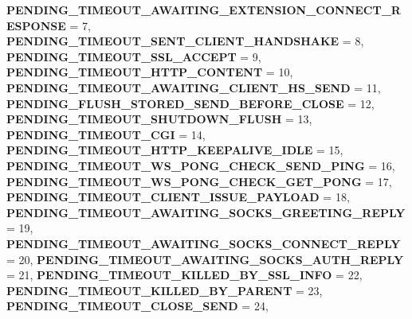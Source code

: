 \begin{DoxyCompactItemize}
{\bfseries P\+E\+N\+D\+I\+N\+G\+\_\+\+T\+I\+M\+E\+O\+U\+T\+\_\+\+A\+W\+A\+I\+T\+I\+N\+G\+\_\+\+E\+X\+T\+E\+N\+S\+I\+O\+N\+\_\+\+C\+O\+N\+N\+E\+C\+T\+\_\+\+R\+E\+S\+P\+O\+N\+SE} = 7, 
{\bfseries P\+E\+N\+D\+I\+N\+G\+\_\+\+T\+I\+M\+E\+O\+U\+T\+\_\+\+S\+E\+N\+T\+\_\+\+C\+L\+I\+E\+N\+T\+\_\+\+H\+A\+N\+D\+S\+H\+A\+KE} = 8, 
{\bfseries P\+E\+N\+D\+I\+N\+G\+\_\+\+T\+I\+M\+E\+O\+U\+T\+\_\+\+S\+S\+L\+\_\+\+A\+C\+C\+E\+PT} = 9, 
\newline
{\bfseries P\+E\+N\+D\+I\+N\+G\+\_\+\+T\+I\+M\+E\+O\+U\+T\+\_\+\+H\+T\+T\+P\+\_\+\+C\+O\+N\+T\+E\+NT} = 10, 
{\bfseries P\+E\+N\+D\+I\+N\+G\+\_\+\+T\+I\+M\+E\+O\+U\+T\+\_\+\+A\+W\+A\+I\+T\+I\+N\+G\+\_\+\+C\+L\+I\+E\+N\+T\+\_\+\+H\+S\+\_\+\+S\+E\+ND} = 11, 
{\bfseries P\+E\+N\+D\+I\+N\+G\+\_\+\+F\+L\+U\+S\+H\+\_\+\+S\+T\+O\+R\+E\+D\+\_\+\+S\+E\+N\+D\+\_\+\+B\+E\+F\+O\+R\+E\+\_\+\+C\+L\+O\+SE} = 12, 
{\bfseries P\+E\+N\+D\+I\+N\+G\+\_\+\+T\+I\+M\+E\+O\+U\+T\+\_\+\+S\+H\+U\+T\+D\+O\+W\+N\+\_\+\+F\+L\+U\+SH} = 13, 
\newline
{\bfseries P\+E\+N\+D\+I\+N\+G\+\_\+\+T\+I\+M\+E\+O\+U\+T\+\_\+\+C\+GI} = 14, 
{\bfseries P\+E\+N\+D\+I\+N\+G\+\_\+\+T\+I\+M\+E\+O\+U\+T\+\_\+\+H\+T\+T\+P\+\_\+\+K\+E\+E\+P\+A\+L\+I\+V\+E\+\_\+\+I\+D\+LE} = 15, 
{\bfseries P\+E\+N\+D\+I\+N\+G\+\_\+\+T\+I\+M\+E\+O\+U\+T\+\_\+\+W\+S\+\_\+\+P\+O\+N\+G\+\_\+\+C\+H\+E\+C\+K\+\_\+\+S\+E\+N\+D\+\_\+\+P\+I\+NG} = 16, 
{\bfseries P\+E\+N\+D\+I\+N\+G\+\_\+\+T\+I\+M\+E\+O\+U\+T\+\_\+\+W\+S\+\_\+\+P\+O\+N\+G\+\_\+\+C\+H\+E\+C\+K\+\_\+\+G\+E\+T\+\_\+\+P\+O\+NG} = 17, 
\newline
{\bfseries P\+E\+N\+D\+I\+N\+G\+\_\+\+T\+I\+M\+E\+O\+U\+T\+\_\+\+C\+L\+I\+E\+N\+T\+\_\+\+I\+S\+S\+U\+E\+\_\+\+P\+A\+Y\+L\+O\+AD} = 18, 
{\bfseries P\+E\+N\+D\+I\+N\+G\+\_\+\+T\+I\+M\+E\+O\+U\+T\+\_\+\+A\+W\+A\+I\+T\+I\+N\+G\+\_\+\+S\+O\+C\+K\+S\+\_\+\+G\+R\+E\+E\+T\+I\+N\+G\+\_\+\+R\+E\+P\+LY} = 19, 
{\bfseries P\+E\+N\+D\+I\+N\+G\+\_\+\+T\+I\+M\+E\+O\+U\+T\+\_\+\+A\+W\+A\+I\+T\+I\+N\+G\+\_\+\+S\+O\+C\+K\+S\+\_\+\+C\+O\+N\+N\+E\+C\+T\+\_\+\+R\+E\+P\+LY} = 20, 
{\bfseries P\+E\+N\+D\+I\+N\+G\+\_\+\+T\+I\+M\+E\+O\+U\+T\+\_\+\+A\+W\+A\+I\+T\+I\+N\+G\+\_\+\+S\+O\+C\+K\+S\+\_\+\+A\+U\+T\+H\+\_\+\+R\+E\+P\+LY} = 21, 
\newline
{\bfseries P\+E\+N\+D\+I\+N\+G\+\_\+\+T\+I\+M\+E\+O\+U\+T\+\_\+\+K\+I\+L\+L\+E\+D\+\_\+\+B\+Y\+\_\+\+S\+S\+L\+\_\+\+I\+N\+FO} = 22, 
{\bfseries P\+E\+N\+D\+I\+N\+G\+\_\+\+T\+I\+M\+E\+O\+U\+T\+\_\+\+K\+I\+L\+L\+E\+D\+\_\+\+B\+Y\+\_\+\+P\+A\+R\+E\+NT} = 23, 
{\bfseries P\+E\+N\+D\+I\+N\+G\+\_\+\+T\+I\+M\+E\+O\+U\+T\+\_\+\+C\+L\+O\+S\+E\+\_\+\+S\+E\+ND} = 24, 

\end{DoxyCompactItemize}
